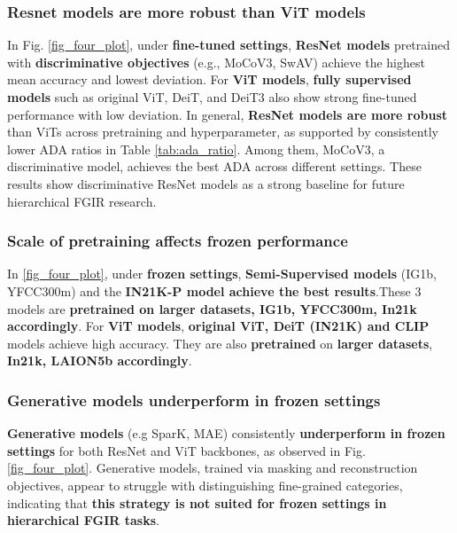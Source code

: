 \documentclass[conference]{IEEEtran}
\begin{document}
\subsubsection{Resnet models are more robust than ViT models}
In Fig. \ref{fig_four_plot}, under \textbf{fine-tuned settings}, \textbf{ResNet models} pretrained with \textbf{discriminative objectives} (e.g., MoCoV3, SwAV) achieve the highest mean accuracy and lowest deviation. For \textbf{ViT models}, \textbf{fully supervised models} such as original ViT, DeiT, and DeiT3 also show strong fine-tuned performance with low deviation. In general, \textbf{ResNet models are more robust} than ViTs across pretraining and hyperparameter, as supported by consistently lower ADA ratios in Table \ref{tab:ada_ratio}. Among them, MoCoV3, a discriminative model, achieves the best ADA across different settings. These results show discriminative ResNet models as a strong baseline for future hierarchical FGIR research.

\subsubsection{Scale of pretraining affects frozen performance}
In \ref{fig_four_plot}, under \textbf{frozen settings}, \textbf{Semi-Supervised models} (IG1b, YFCC300m) and the \textbf{IN21K-P model achieve the best results}.These 3 models are \textbf{pretrained on larger datasets, IG1b, YFCC300m, In21k accordingly}. For \textbf{ViT models}, \textbf{original ViT, DeiT (IN21K) and CLIP} models achieve high accuracy. They are also \textbf{pretrained} on \textbf{larger datasets}, \textbf{In21k, LAION5b accordingly}.

\subsubsection{Generative models underperform in frozen settings}
\textbf{Generative models} (e.g SparK, MAE) consistently \textbf{underperform in frozen settings} for both ResNet and ViT backbones, as observed in Fig. \ref{fig_four_plot}. Generative models, trained via masking and reconstruction objectives, appear to struggle with distinguishing fine-grained categories, indicating that \textbf{this strategy is not suited for frozen settings in hierarchical FGIR tasks}.
\end{document}
